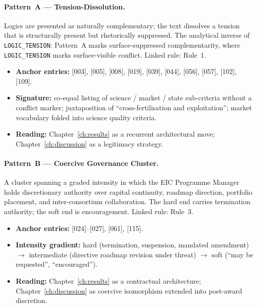 \paragraph{Pattern~A --- Tension-Dissolution.}
Logics are presented as naturally complementary; the text dissolves a
tension that is structurally present but rhetorically suppressed. The
analytical inverse of \texttt{LOGIC\_TENSION}: Pattern~A marks
surface-suppressed complementarity, where \texttt{LOGIC\_TENSION} marks
surface-visible conflict. Linked rule: Rule~1.

\begin{itemize}[leftmargin=*]
  \item \textbf{Anchor entries:} [003], [005], [008], [019], [039],
    [044], [056], [057], [102], [109].
  \item \textbf{Signature:} co-equal listing of science / market / state
    sub-criteria without a conflict marker; juxtaposition of
    \enquote{cross-fertilisation and exploitation}; market vocabulary
    folded into science quality criteria.
  \item \textbf{Reading:} Chapter~\ref{ch:results} as a recurrent
    architectural move; Chapter~\ref{ch:discussion} as a legitimacy
    strategy.
\end{itemize}

\paragraph{Pattern~B --- Coercive Governance Cluster.}
A cluster spanning a graded intensity in which the EIC Programme
Manager holds discretionary authority over capital continuity, roadmap
direction, portfolio placement, and inter-consortium collaboration. The
hard end carries termination authority; the soft end is encouragement.
Linked rule: Rule~3.

\begin{itemize}[leftmargin=*]
  \item \textbf{Anchor entries:} [024]--[027], [061], [115].
  \item \textbf{Intensity gradient:} hard (termination, suspension,
    mandated amendment) $\rightarrow$ intermediate (directive roadmap
    revision under threat) $\rightarrow$ soft (\enquote{may be
    requested}, \enquote{encouraged}).
  \item \textbf{Reading:} Chapter~\ref{ch:results} as a contractual
    architecture; Chapter~\ref{ch:discussion} as coercive isomorphism
    extended into post-award discretion.
\end{itemize}

